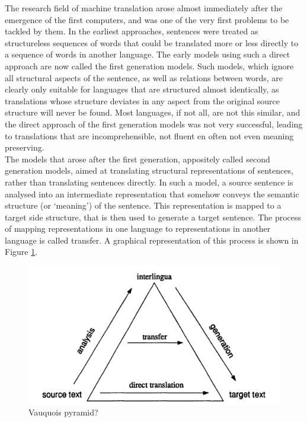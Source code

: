 \documentclass[a4paper, 11pt]{report}
\theoremstyle{definition}
\theoremstyle{plain}
\begin{document}
The research field of machine translation arose almost immediately after the emergence of the first computers, and was one of the very first problems to be tackled by them. In the earliest approaches, sentences were treated as structureless sequences of words that could be translated more or less directly to a sequence of words in another language. The early models using such a direct approach are now called the first generation models. Such models, which ignore all structural aspects of the sentence, as well as relations between words, are clearly only suitable for languages that are structured almost identically, as translations whose structure deviates in any aspect from the original source structure will never be found. Most languages, if not all, are not this similar, and the direct approach of the first generation models was not very successful, leading to translations that are incomprehensible, not fluent en often not even meaning preserving.\\
The models that arose after the first generation, appositely called second generation models, aimed at translating structural representations of sentences, rather than translating sentences directly. In such a model, a source sentence is analysed into an intermediate representation that somehow conveys the semantic structure (or `meaning') of the sentence. This representation is mapped to a target side structure, that is then used to generate a target sentence. The process of mapping representations in one language to representations in another language is called transfer. A graphical representation of this process is shown in Figure \ref{fig:triangle}. 

\begin{figure}[!ht]
\includegraphics[scale=0.2]{translation_triangle.png}
\caption{Vauquois pyramid?}\label{fig:triangle}
\end{figure}
\end{document}

